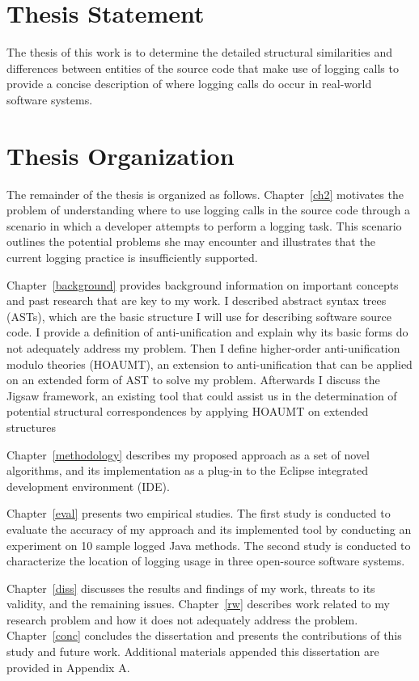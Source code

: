 \section{Thesis Statement} \label{intro-stmt}
The thesis of this work is to determine the detailed structural similarities and differences between entities of the source code that make use of logging calls to provide a concise description of where logging calls do occur in real-world software systems.

\section{Thesis Organization} \label{intro-org}
The remainder of the thesis is organized as follows. Chapter~\ref{ch2} motivates the problem of understanding where to use logging calls in the source code through a scenario in which a developer attempts to perform a logging task. This scenario outlines the potential problems she may encounter and illustrates that the current logging practice is insufficiently supported.

Chapter~\ref{background} provides background information on important concepts and past research that are key to my work.  I described abstract syntax trees (ASTs), which are the basic structure I will use for describing software source code. I provide a definition of anti-unification and explain why its basic forms do not adequately address my problem. Then I define higher-order anti-unification modulo theories (HOAUMT), an extension to anti-unification that can be applied on an extended form of AST to solve my problem. Afterwards I discuss the Jigsaw framework, an existing tool that could assist us in the determination of potential structural correspondences by applying HOAUMT on extended structures

Chapter~\ref{methodology} describes my proposed approach as a set of novel algorithms, and its implementation as a plug-in to the Eclipse integrated development environment (IDE).

Chapter~\ref{eval} presents two empirical studies. The first study is conducted to evaluate the accuracy of my approach and its implemented tool by conducting an experiment on 10 sample logged Java methods. The second study is conducted to characterize the location of logging usage in three open-source software systems.

Chapter~\ref{diss} discusses the results and findings of my work, threats to its validity, and the remaining issues. Chapter~\ref{rw} describes work related to my research problem and how it does not adequately address the problem. Chapter~\ref{conc} concludes the dissertation and presents the contributions of this study and future work. Additional materials appended this dissertation are provided in Appendix A.


